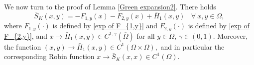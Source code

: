 \documentclass[12pt,reqno]{amsart}
\numberwithin{equation}{section}
\theoremstyle{definition}
\newenvironment{customthm}[1]
{\renewcommand\theinnercustomthm{#1}\innercustomthm}
{\endinnercustomthm}
\theoremstyle{remark}
\begin{document}
 














We now turn to the proof of Lemma \ref{Green expansion2}. 
\begin{customthm}{A.2}\label{lemA2}
There holds
\begin{equation*}
\bar{S}_K(x,y)=-F_{1,y}(x)-F_{2,y}(x)+\bar{H}_1(x,y) \ \ \ \ \forall\ x,y\in\Omega,
\end{equation*}
where $ F_{1,y}(\cdot) $ is defined by \eqref{exp of F_{1,y}} and $ F_{2,y}(\cdot) $ is defined by \eqref{exp of F_{2,y}},
and $ x\to \bar{H}_1(x,y)\in C^{1,\gamma}(\overline{\Omega})$ for all $ y\in \Omega $, $ \gamma\in (0, 1) $.  Moreover, the function $(x, y)\to \bar{H}_1(x,y)\in C^1(\Omega\times\Omega),$ and in particular the corresponding Robin function $x\to \bar{S}_K(x,x)\in C^1(\Omega)$.
\end{customthm}
\end{document}
